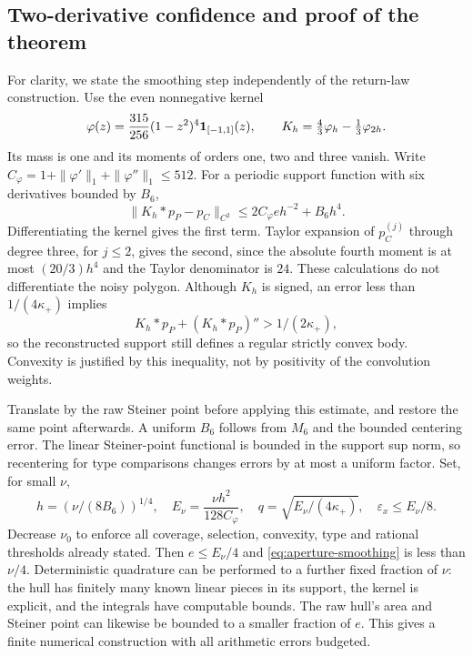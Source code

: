 \subsection{Two-derivative confidence and proof of the theorem}
For clarity, we state the smoothing step independently of the return-law
construction. Use the even nonnegative kernel
\[
 \varphi(z)=\frac{315}{256}(1-z^2)^4\mathbf 1_{[-1,1]}(z),\qquad
 K_h=\tfrac43\varphi_h-\tfrac13\varphi_{2h}.
\]
Its mass is one and its moments of orders one, two and three vanish.
Write $C_\varphi=1+\|\varphi'\|_1+\|\varphi''\|_1\le512$.
For a periodic support function with six derivatives bounded by $B_6$,
\begin{equation}\label{eq:aperture-smoothing}
       \|K_h*p_P-p_C\|_{C^2}
                    \le2C_\varphi e h^{-2}+B_6h^4.
\end{equation}
Differentiating the kernel gives the first term. Taylor expansion of
$p_C^{(j)}$ through degree three, for $j\le2$, gives the second,
since the absolute fourth moment is at most $(20/3)h^4$ and the
Taylor denominator is $24$. These calculations do not differentiate
the noisy polygon. Although $K_h$ is signed, an error less than
$1/(4\kappa_+)$ implies
\[
       K_h*p_P+(K_h*p_P)''>1/(2\kappa_+),
\]
so the reconstructed support still defines a regular strictly convex
body. Convexity is justified by this inequality, not by positivity of
the convolution weights.

Translate by the raw Steiner point before applying this estimate, and
restore the same point afterwards. A uniform $B_6$ follows from $M_6$
and the bounded centering error. The linear Steiner-point functional is
bounded in the support sup norm, so recentering for type comparisons
changes errors by at most a uniform factor. Set, for small $\nu$,
\[
 h=(\nu/(8B_6))^{1/4},\quad
 E_\nu=\frac{\nu h^2}{128C_\varphi},\quad
 q=\sqrt{E_\nu/(4\kappa_+)},\quad
 \varepsilon_x\le E_\nu/8.
\]
Decrease $\nu_0$ to enforce all coverage, selection, convexity, type and
rational thresholds already stated. Then $e\le E_\nu/4$ and
\eqref{eq:aperture-smoothing} is less than $\nu/4$. Deterministic
quadrature can be performed to a further fixed fraction of $\nu$:
the hull has finitely many known linear pieces in its support, the
kernel is explicit, and the integrals have computable bounds. The raw
hull's area and Steiner point can likewise be bounded to a smaller
fraction of $e$. This gives a finite numerical construction with all
arithmetic errors budgeted.

